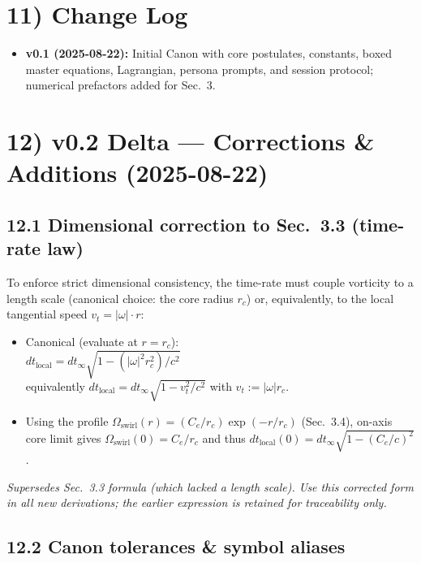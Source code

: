 \documentclass[11pt, a4paper]{article}
\begin{document}
\section*{11) Change Log}

\begin{itemize}
    \item \textbf{v0.1 (2025-08-22):} Initial Canon with core postulates, constants, boxed master equations, Lagrangian, persona prompts, and session protocol; numerical prefactors added for Sec.~3.
\end{itemize}

\section*{12) v0.2 Delta --- Corrections \& Additions (2025-08-22)}

\subsection*{12.1 Dimensional correction to Sec.~3.3 (time-rate law)}

To enforce strict dimensional consistency, the time-rate must couple vorticity to a length scale (canonical choice: the core radius $r_c$) or, equivalently, to the local tangential speed $v_t = |\omega| \cdot r$:

\begin{itemize}
    \item Canonical (evaluate at $r = r_c$):\\
    $dt_{\text{local}} = dt_{\infty} \sqrt{1 - (|\omega|^2 r_c^2)/c^2}$\\
    equivalently $dt_{\text{local}} = dt_{\infty} \sqrt{1 - v_t^2/c^2}$ with $v_t := |\omega| r_c$.
    \item Using the profile $\Omega_{\text{swirl}}(r) = (C_e/r_c) \exp(-r/r_c)$ (Sec.~3.4), on-axis core limit gives $\Omega_{\text{swirl}}(0) = C_e/r_c$ and thus $dt_{\text{local}}(0) = dt_{\infty} \sqrt{1 - (C_e/c)^2}$.
\end{itemize}

\textit{Supersedes Sec.~3.3 formula (which lacked a length scale). Use this corrected form in all new derivations; the earlier expression is retained for traceability only.}

\subsection*{12.2 Canon tolerances \& symbol aliases}
\end{document}
